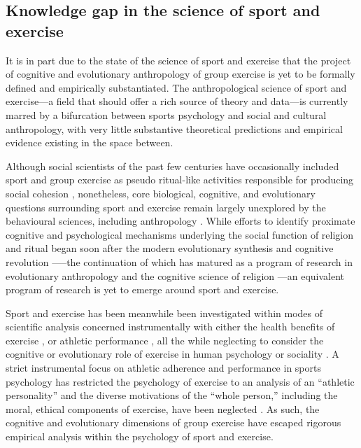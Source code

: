 \subsection{Knowledge gap in the science of sport and exercise}
It is in part due to the state of the science of sport and exercise that the project of cognitive and evolutionary anthropology of group exercise is yet to be formally defined and empirically substantiated. The anthropological science of sport and exercise---a field that should offer a rich source of theory and data---is currently marred by a bifurcation between sports psychology and social and cultural anthropology, with very little substantive theoretical predictions and empirical evidence existing in the space between.

Although social scientists of the past few centuries have occasionally included sport and group exercise as pseudo ritual-like activities responsible for producing social cohesion \citep{Durkheim1965,Mauss1935,Turner1977}, nonetheless, core biological, cognitive, and evolutionary questions surrounding sport and exercise remain largely unexplored by the behavioural sciences, including anthropology \citep{Blanchard1995,Downey2005a}.    While efforts to identify proximate cognitive and psychological mechanisms underlying the social function of religion and ritual began soon after the modern evolutionary synthesis \citep{Huxley1942} and cognitive revolution \citep[e.g.,][]{Turner1986,1987}—--the continuation of which has matured as a program of research in evolutionary anthropology and the cognitive science of religion \citep{Barrett2002,Lawson1993,Sperber1996,Whitehouse2004}---an equivalent program of research is yet to emerge around sport and exercise.

Sport and exercise has been meanwhile been investigated within modes of scientific analysis concerned instrumentally with either the health benefits of exercise \citep{Fiuza-Luces2013,Morris1994}, or athletic performance \citep{Beedie2015a}, all the while neglecting to consider the cognitive or evolutionary role of exercise in human psychology or sociality \citep{Balish2013,Coulter2015}. A strict instrumental focus on athletic adherence and performance in sports psychology has restricted the psychology of exercise to an analysis of an ``athletic personality'' and the diverse motivations of the ``whole person,'' including the moral, ethical components of exercise, have been neglected \citep{Coulter2015,Laborde2014}.  As such, the cognitive and evolutionary dimensions of group exercise have escaped rigorous empirical analysis within the psychology of sport and exercise.

